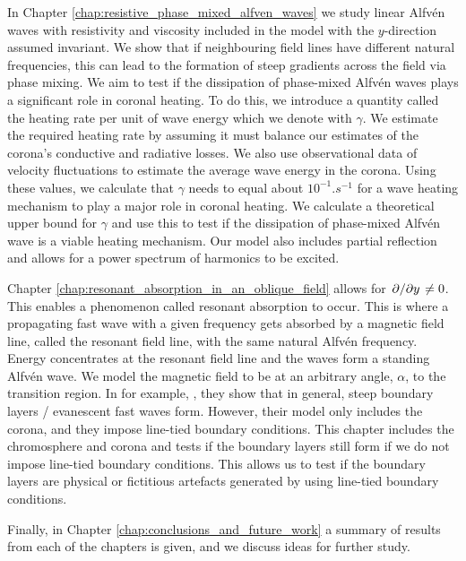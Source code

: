 In Chapter \ref{chap:resistive_phase_mixed_alfven_waves} we study linear Alfv\'en waves with resistivity and viscosity included in the model with the $y$-direction assumed invariant. We show that if neighbouring field lines have different natural frequencies, this can lead to the formation of steep gradients across the field via phase mixing. We aim to test if the dissipation of phase-mixed Alfv\'en waves plays a significant role in coronal heating. To do this, we introduce a quantity called the heating rate per unit of wave energy which we denote with $\gamma$. We estimate the required heating rate by assuming it must balance our estimates of the corona's conductive and radiative losses. We also use observational data of velocity fluctuations to estimate the average wave energy in the corona. Using these values, we calculate that $\gamma$ needs to equal about $10^{-1}\si{.s^{-1}}$ for a wave heating mechanism to play a major role in coronal heating. We calculate a theoretical upper bound for $\gamma$ and use this to test if the dissipation of phase-mixed Alfv\'en wave is a viable heating mechanism. Our model also includes partial reflection and allows for a power spectrum of harmonics to be excited.

Chapter \ref{chap:resonant_absorption_in_an_oblique_field} allows for $\pdv*{}{y}\ne0$. This enables a phenomenon called resonant absorption to occur. This is where a propagating fast wave with a given frequency gets absorbed by a magnetic field line, called the resonant field line, with the same natural Alfv\'en frequency. Energy concentrates at the resonant field line and the waves form a standing Alfv\'en wave. We model the magnetic field to be at an arbitrary angle, $\alpha$, to the transition region. In for example, \citet{Halberstadt1993,Halberstadt1995,Arregui2003}, they show that in general, steep boundary layers / evanescent fast waves form. However, their model only includes the corona, and they impose line-tied boundary conditions. This chapter includes the chromosphere and corona and tests if the boundary layers still form if we do not impose line-tied boundary conditions. This allows us to test if the boundary layers are physical or fictitious artefacts generated by using line-tied boundary conditions.

Finally, in Chapter \ref{chap:conclusions_and_future_work} a summary of results from each of the chapters is given, and we discuss ideas for further study.